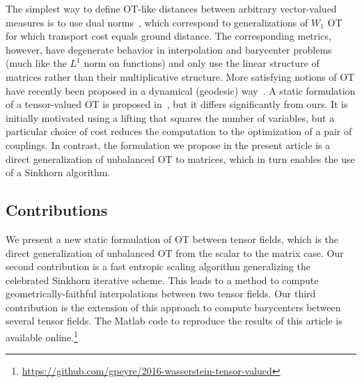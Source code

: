 The simplest way to define OT-like distances between arbitrary vector-valued measures is to use dual norms~\cite{Ning2014metrics}, which correspond to generalizations of $W_1$ OT for which transport cost equals ground distance. The corresponding metrics, however, have degenerate behavior in interpolation and barycenter problems (much like the $L^1$ norm on functions) and only use the linear structure of matrices rather than their multiplicative structure.
%
More satisfying notions of OT have recently been proposed in a dynamical (geodesic) way~\cite{JiangSpectral}. 
%
A static formulation of a tensor-valued OT is proposed in~\cite{ning2015matrix}, but it differs significantly from ours. It is initially motivated using a lifting that squares the number of variables, but a particular choice of cost reduces the computation to the optimization of a pair of couplings. In contrast, the formulation we propose in the present article is a direct generalization of unbalanced OT to matrices, which in turn enables the use of a Sinkhorn algorithm. 







\subsection{Contributions} 

We present a new static formulation of OT between tensor fields, which is the direct generalization of unbalanced OT from the scalar to the matrix case.
%
Our second contribution is a fast entropic scaling algorithm generalizing the celebrated Sinkhorn iterative scheme. This leads to a method to compute geometrically-faithful interpolations between two tensor fields. 
%
Our third contribution is the extension of this approach to compute barycenters between several tensor fields. 
%
The Matlab code to reproduce the results of this article is available online.\footnote{\url{https://github.com/gpeyre/2016-wasserstein-tensor-valued}}

